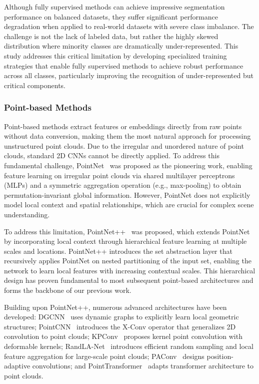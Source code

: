 \documentclass[preprint,12pt]{elsarticle}
\begin{document}
Although fully supervised methods can achieve impressive segmentation performance on balanced datasets, they suffer significant performance degradation when applied to real-world datasets with severe class imbalance. The challenge is not the lack of labeled data, but rather the highly skewed distribution where minority classes are dramatically under-represented. This study addresses this critical limitation by developing specialized training strategies that enable fully supervised methods to achieve robust performance across all classes, particularly improving the recognition of under-represented but critical components.

\subsubsection{Point-based Methods}
Point-based methods extract features or embeddings directly from raw points without data conversion, making them the most natural approach for processing unstructured point clouds. Due to the irregular and unordered nature of point clouds, standard 2D CNNs cannot be directly applied. To address this fundamental challenge, PointNet~\cite{qi2017pointnet} was proposed as the pioneering work, enabling feature learning on irregular point clouds via shared multilayer perceptrons (MLPs) and a symmetric aggregation operation (e.g., max-pooling) to obtain permutation-invariant global information. However, PointNet does not explicitly model local context and spatial relationships, which are crucial for complex scene understanding.

To address this limitation, PointNet++~\cite{qi2017pointnet++} was proposed, which extends PointNet by incorporating local context through hierarchical feature learning at multiple scales and locations. PointNet++ introduces the set abstraction layer that recursively applies PointNet on nested partitioning of the input set, enabling the network to learn local features with increasing contextual scales. This hierarchical design has proven fundamental to most subsequent point-based architectures and forms the backbone of our previous work.

Building upon PointNet++, numerous advanced architectures have been developed: DGCNN~\cite{wang2019dynamic} uses dynamic graphs to explicitly learn local geometric structures; PointCNN~\cite{li2018pointcnn} introduces the X-Conv operator that generalizes 2D convolution to point clouds; KPConv~\cite{thomas2019kpconv} proposes kernel point convolution with deformable kernels; RandLA-Net~\cite{hu2020randla} introduces efficient random sampling and local feature aggregation for large-scale point clouds; PAConv~\cite{xu2021paconv} designs position-adaptive convolutions; and PointTransformer~\cite{zhao2021pointtransformer} adapts transformer architecture to point clouds.
\end{document}
